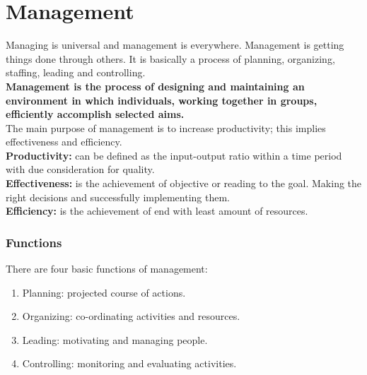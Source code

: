 \documentclass[11pt]{book}
\begin{document}
\part{Management}
Managing is universal and management is everywhere. Management is getting things done through others. It is basically a process of planning, organizing, staffing, leading and controlling. \\
\textbf{Management is the process of designing and maintaining an environment in which individuals, working together in groups, efficiently accomplish selected aims.} \\
The main purpose of management is to increase productivity; this implies effectiveness and efficiency. \\
\textbf{Productivity: } can be defined as the input-output ratio within a time period with due consideration for quality. \\
\textbf{Effectiveness: } is the achievement of objective or reading to the goal. Making the right decisions and successfully implementing them. \\
\textbf{Efficiency: } is the achievement of end with least amount of resources.

\section{Functions}
There are four basic functions of management:
\begin{enumerate}
	\item Planning: projected course of actions.
	\item Organizing: co-ordinating activities and resources.
	\item Leading: motivating and managing people.
	\item Controlling: monitoring and evaluating activities.
\end{enumerate}
\end{document}
